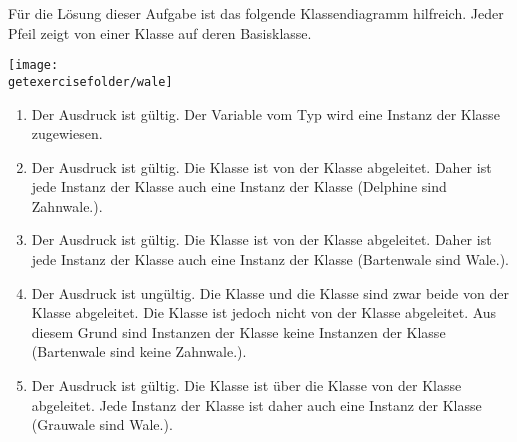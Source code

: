 \begin{frame}[t]%
F\"ur die L\"osung dieser Aufgabe ist das folgende Klassendiagramm hilfreich.
Jeder Pfeil zeigt von einer Klasse auf deren Basisklasse.
\begin{center}
\texttt{[image: \\getexercisefolder/wale]}
\end{center}
\end{frame}

\begin{frame}[t]%

\begin{enumerate}
\item
  Der Ausdruck ist g\"ultig.
  Der Variable  vom Typ  wird eine Instanz der Klasse  zugewiesen.
\item
  Der Ausdruck ist g\"ultig.
  Die Klasse  ist von der Klasse  abgeleitet.
  Daher ist jede Instanz der Klasse  auch eine Instanz der Klasse  (\glqq Delphine sind Zahnwale.\grqq).
\item
  Der Ausdruck ist g\"ultig.
  Die Klasse  ist von der Klasse  abgeleitet.
  Daher ist jede Instanz der Klasse  auch eine Instanz der Klasse  (\glqq Bartenwale sind Wale.\grqq).
\item
  Der Ausdruck ist ung\"ultig.
  Die Klasse  und die Klasse  sind zwar beide von der Klasse  abgeleitet.
  Die Klasse  ist jedoch nicht von der Klasse  abgeleitet.
  Aus diesem Grund sind Instanzen der Klasse  keine Instanzen der Klasse  (\glqq Bartenwale sind keine Zahnwale.\grqq).
\item
  Der Ausdruck ist g\"ultig.
  Die Klasse  ist \"uber die Klasse  von der Klasse  abgeleitet.
  Jede Instanz der Klasse  ist daher auch eine Instanz der Klasse  (\glqq Grauwale sind Wale.\grqq).
\end{enumerate}
\end{frame}

